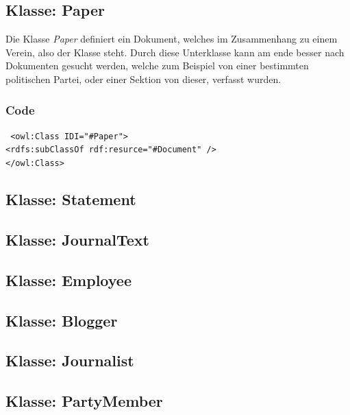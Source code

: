 ﻿\documentclass[
    11pt,
    latin1,
    a4paper,
    oneside
]{scrreprt}
\begin{document}
\subsection{Klasse: Paper} \label{sec:class_paper}

Die Klasse \emph{Paper} definiert ein Dokument, welches im Zusammenhang zu einem Verein, also der Klasse  steht. Durch diese Unterklasse kann am ende besser nach Dokumenten gesucht werden, welche zum Beispiel von einer bestimmten politischen Partei, oder einer Sektion von dieser, verfasst wurden.

\subsubsection{Code}  \label{sec:class_paper_code}

\texttt{ <owl:Class IDI="#Paper"> \\
	<rdfs:subClassOf rdf:resurce="#Document" /> \\
</owl:Class> }


\subsection{Klasse: Statement} \label{sec:class_statement}

\subsection{Klasse: JournalText} \label{sec:class_journaltext}

\subsection{Klasse: Employee} \label{sec:class_employee}

\subsection{Klasse: Blogger} \label{sec:class_blogger}

\subsection{Klasse: Journalist} \label{sec:class_journalist}

\subsection{Klasse: PartyMember} \label{sec:class_partymember}
\end{document}

